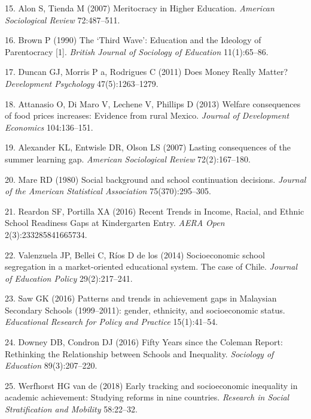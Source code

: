 \documentclass[9pt,twocolumn,twoside,]{pnas-new}
\begin{document}
\leavevmode\hypertarget{ref-Alon2007}{}%
15. Alon S, Tienda M (2007) Meritocracy in Higher Education.
\emph{American Sociological Review} 72:487--511.

\leavevmode\hypertarget{ref-Brown1990}{}%
16. Brown P (1990) The `Third Wave': Education and the Ideology of
Parentocracy {[}1{]}. \emph{British Journal of Sociology of Education}
11(1):65--86.

\leavevmode\hypertarget{ref-Duncan2011}{}%
17. Duncan GJ, Morris P a, Rodrigues C (2011) Does Money Really Matter?
\emph{Development Psychology} 47(5):1263--1279.

\leavevmode\hypertarget{ref-Attanasio2013}{}%
18. Attanasio O, Di Maro V, Lechene V, Phillips D (2013) Welfare
consequences of food prices increases: Evidence from rural Mexico.
\emph{Journal of Development Economics} 104:136--151.

\leavevmode\hypertarget{ref-Alexander2007}{}%
19. Alexander KL, Entwisle DR, Olson LS (2007) Lasting consequences of
the summer learning gap. \emph{American Sociological Review}
72(2):167--180.

\leavevmode\hypertarget{ref-Mare1980}{}%
20. Mare RD (1980) Social background and school continuation decisions.
\emph{Journal of the American Statistical Association} 75(370):295--305.

\leavevmode\hypertarget{ref-Reardon2016}{}%
21. Reardon SF, Portilla XA (2016) Recent Trends in Income, Racial, and
Ethnic School Readiness Gaps at Kindergarten Entry. \emph{AERA Open}
2(3):233285841665734.

\leavevmode\hypertarget{ref-Valenzuela2014}{}%
22. Valenzuela JP, Bellei C, Ríos D de los (2014) Socioeconomic school
segregation in a market-oriented educational system. The case of Chile.
\emph{Journal of Education Policy} 29(2):217--241.

\leavevmode\hypertarget{ref-Saw2016}{}%
23. Saw GK (2016) Patterns and trends in achievement gaps in Malaysian
Secondary Schools (1999--2011): gender, ethnicity, and socioeconomic
status. \emph{Educational Research for Policy and Practice}
15(1):41--54.

\leavevmode\hypertarget{ref-Downey2016}{}%
24. Downey DB, Condron DJ (2016) Fifty Years since the Coleman Report:
Rethinking the Relationship between Schools and Inequality.
\emph{Sociology of Education} 89(3):207--220.

\leavevmode\hypertarget{ref-VandeWerfhorst2018}{}%
25. Werfhorst HG van de (2018) Early tracking and socioeconomic
inequality in academic achievement: Studying reforms in nine countries.
\emph{Research in Social Stratification and Mobility} 58:22--32.
\end{document}
